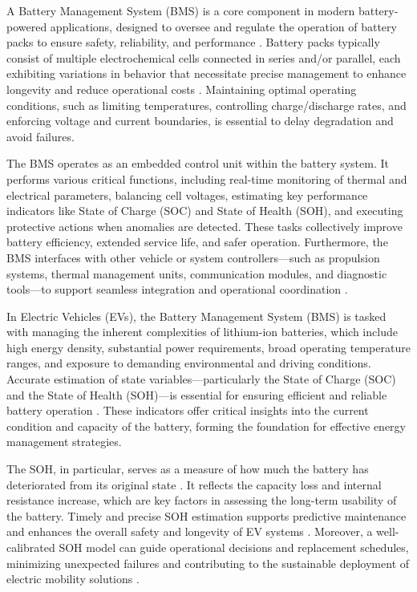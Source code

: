 

A Battery Management System (BMS) is a core component in modern battery-powered applications, designed to oversee and regulate the operation of battery packs to ensure safety, reliability, and performance \cite{wevj-12-00120-v2}. Battery packs typically consist of multiple electrochemical cells connected in series and/or parallel, each exhibiting variations in behavior that necessitate precise management to enhance longevity and reduce operational costs \cite{energies-18-00342-v2,wevj-12-00120-v2}. Maintaining optimal operating conditions, such as limiting temperatures, controlling charge/discharge rates, and enforcing voltage and current boundaries, is essential to delay degradation and avoid failures.

The BMS operates as an embedded control unit within the battery system. It performs various critical functions, including real-time monitoring of thermal and electrical parameters, balancing cell voltages, estimating key performance indicators like State of Charge (SOC) and State of Health (SOH), and executing protective actions when anomalies are detected. These tasks collectively improve battery efficiency, extended service life, and safer operation. Furthermore, the BMS interfaces with other vehicle or system controllers—such as propulsion systems, thermal management units, communication modules, and diagnostic tools—to support seamless integration and operational coordination \cite{wevj-12-00120-v2}.


In Electric Vehicles (EVs), the Battery Management System (BMS) is tasked with managing the inherent complexities of lithium-ion batteries, which include high energy density, substantial power requirements, broad operating temperature ranges, and exposure to demanding environmental and driving conditions. Accurate estimation of state variables—particularly the State of Charge (SOC) and the State of Health (SOH)—is essential for ensuring efficient and reliable battery operation \cite{105207_1_5.0172683}. These indicators offer critical insights into the current condition and capacity of the battery, forming the foundation for effective energy management strategies.

The SOH, in particular, serves as a measure of how much the battery has deteriorated from its original state \cite{s41598-025-92262-8}. It reflects the capacity loss and internal resistance increase, which are key factors in assessing the long-term usability of the battery. Timely and precise SOH estimation supports predictive maintenance and enhances the overall safety and longevity of EV systems \cite{105207_1_5.0172683,electronics-13-01675}. Moreover, a well-calibrated SOH model can guide operational decisions and replacement schedules, minimizing unexpected failures and contributing to the sustainable deployment of electric mobility solutions \cite{electronics-13-01675}.


